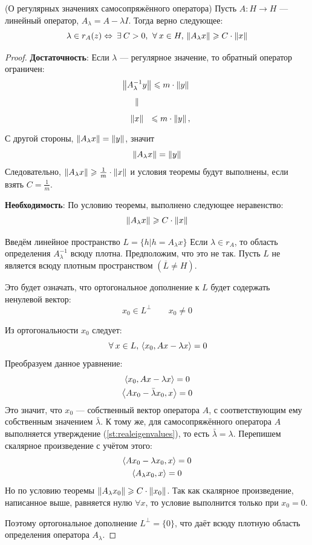 \documentclass[12pt]{article}
\begin{document}
	\begin{theorem}
		(О регулярных значениях самосопряжённого оператора) Пусть $A: H \rightarrow H$ --- линейный оператор, 
		$A_{\lambda} = A - \lambda I$. Тогда верно следующее:
		$$\lambda \in r_{A}(z) \Leftrightarrow \exists C > 0,\, \forall x \in H,\, \norm{A_{\lambda}x} \geq C\cdot\norm{x}$$
	\end{theorem}
	\begin{proof}
		\textbf{Достаточность}: 
		Если $\lambda$ --- регулярное значение, то обратный оператор ограничен:
		$$
		\begin{CD}
			\norm{A_{\lambda}^{-1}y} @.\leq m\cdot\norm{y} \\
			\parallel \\		
			\norm{x} @.\leq m\cdot\norm{y},\,
		\end{CD}
		$$
		
		С другой стороны, $\left\| A_{\lambda}x \right\| = \left\| y \right\|$, значит
		$$\left\| A_{\lambda}x \right\| = \left\| y \right\|$$
		Следовательно, $\left\| A_{\lambda}x \right\|\geqslant\frac{1}{m}\cdot\left\| x \right\|$ и условия теоремы будут выполнены, если взять
		$C = \frac{1}{m}$.
		
		\textbf{Необходимость}: 
		По условию теоремы, выполнено следующее неравенство:
		$$\left\| A_{\lambda}x \right\| \geqslant C\cdot\left\| x \right\|$$
		
		Введём линейное пространство $L = \{ h|h=A_{\lambda}x\}$ Если $\lambda \in r_A$, то область определения
		$A_{\lambda}^{-1}$ всюду плотна. Предположим, что это не так. Пусть $L$ не 
		является всюду плотным пространством $\left(\overline{L}\neq H\right)$.
		
		Это будет означать, что ортогональное дополнение к $L$ будет содержать ненулевой вектор:
		$$x_0 \in L^{\perp} \qquad x_0 \neq 0$$
		
		Из ортогональности $x_0$ следует:
		$$\forall x\in L,\, \scal{x_0}{Ax - \lambda x} = 0$$
		Преобразуем данное уравнение:
		\begin{gather*}
			\left\langle x_0, Ax - \lambda x \right\rangle = 0 \\
			\left\langle Ax_0 - \bar{\lambda} x_0, x \right\rangle = 0 \\
		\end{gather*}
		Это значит, что $x_0$ --- собственный вектор оператора $A$, с соответствующим ему собственным значением $\bar{\lambda}$.
		К тому же, для самосопряжённого оператора $A$ выполняется утверждение (\ref{st:realeigenvalues}), то есть 
		$\bar{\lambda} = \lambda$. Перепишем скалярное произведение с учётом этого:
		\begin{gather*}
			\left\langle Ax_0 - \lambda x_0, x \right\rangle = 0 \\
			\left\langle A_{\lambda} x_0, x \right\rangle = 0
		\end{gather*}
		Но по условию теоремы $\left\| A_{\lambda}x_0 \right\| \geqslant C\cdot\left\| x_0 \right\|$. Так как скалярное произведение, 
		написанное выше, равняется нулю $\forall x$, то условие выполнится только при $x_0 = 0$. 
		
		Поэтому ортогональное дополнение $L^{\perp} = \{0\}$, что даёт всюду плотную область определения оператора $A_{\lambda}$.
	\end{proof}
	
\end{document}
